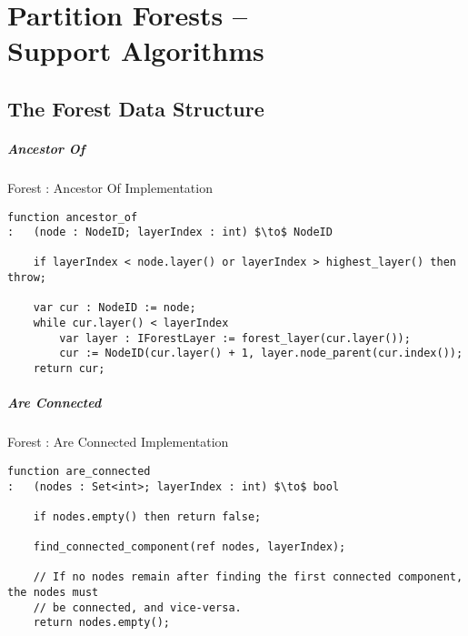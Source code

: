 \chapter[Partition Forests -- Support Algorithms]{Partition Forests --\\Support Algorithms}
\label{chap:appendixpf}

\section{The Forest Data Structure}

\paragraph{Ancestor Of}

\begin{stulisting}[H]
\caption{Forest : Ancestor Of Implementation}
\begin{lstlisting}[style=Default]
function ancestor_of
:	(node : NodeID; layerIndex : int) $\to$ NodeID

	if layerIndex < node.layer() or layerIndex > highest_layer() then throw;

	var cur : NodeID := node;
	while cur.layer() < layerIndex
		var layer : IForestLayer := forest_layer(cur.layer());
		cur := NodeID(cur.layer() + 1, layer.node_parent(cur.index());
	return cur;
\end{lstlisting}
\end{stulisting}

\paragraph{Are Connected}

\begin{stulisting}[H]
\caption{Forest : Are Connected Implementation}
\begin{lstlisting}[style=Default]
function are_connected
:	(nodes : Set<int>; layerIndex : int) $\to$ bool

	if nodes.empty() then return false;

	find_connected_component(ref nodes, layerIndex);

	// If no nodes remain after finding the first connected component, the nodes must
	// be connected, and vice-versa.
	return nodes.empty();
\end{lstlisting}
\end{stulisting}

